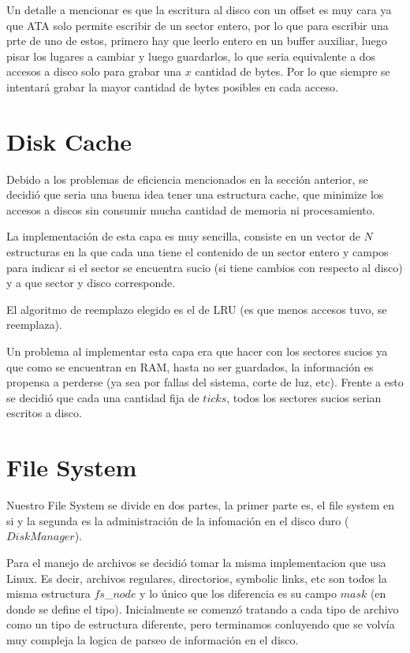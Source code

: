 \documentclass[english]{article}
\begin{document}
Un detalle a mencionar es que la escritura al disco con un offset
es muy cara ya que ATA solo permite escribir de un sector entero,
por lo que para escribir una prte de uno de estos, primero hay que
leerlo entero en un buffer auxiliar, luego pisar los lugares a cambiar
y luego guardarlos, lo que seria equivalente a dos accesos a disco
solo para grabar una $x$ cantidad de bytes. Por lo que siempre se
intentará grabar la mayor cantidad de bytes posibles en cada acceso.

\pagebreak{}


\section{Disk Cache}

Debido a los problemas de eficiencia mencionados en la sección anterior,
se decidió que seria una buena idea tener una estructura cache, que
minimize los accesos a discos sin consumir mucha cantidad de memoria
ni procesamiento. 

La implementación de esta capa es muy sencilla, consiste en un vector
de $N$ estructuras en la que cada una tiene el contenido de un sector
entero y campos para indicar si el sector se encuentra sucio (si tiene
cambios con respecto al disco) y a que sector y disco corresponde.

El algoritmo de reemplazo elegido es el de LRU (es que menos accesos
tuvo, se reemplaza). 

Un problema al implementar esta capa era que hacer con los sectores
sucios ya que como se encuentran en RAM, hasta no ser guardados, la
información es propensa a perderse (ya sea por fallas del sistema,
corte de luz, etc). Frente a esto se decidió que cada una cantidad
fija de $ticks$, todos los sectores sucios serian escritos a disco. 

\pagebreak{}


\section{File System}

Nuestro File System se divide en dos partes, la primer parte es, el
file system en si y la segunda es la administración de la infomación
en el disco duro ($DiskManager$).

Para el manejo de archivos se decidió tomar la misma implementacion
que usa Linux. Es decir, archivos regulares, directorios, symbolic
links, etc son todos la misma estructura $fs$\_$node$ y lo único
que los diferencia es su campo $mask$ (en donde se define el tipo).
Inicialmente se comenzó tratando a cada tipo de archivo como un tipo
de estructura diferente, pero terminamos conluyendo que se volvía
muy compleja la logica de parseo de información en el disco.
\end{document}
